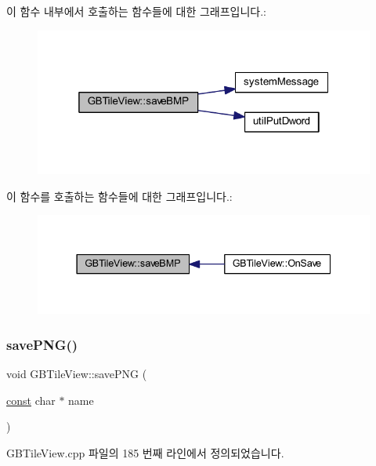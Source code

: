 이 함수 내부에서 호출하는 함수들에 대한 그래프입니다.\+:
\nopagebreak
\begin{figure}[H]
\begin{center}
\leavevmode
\includegraphics[width=319pt]{class_g_b_tile_view_ac61ccd982b57db14794e1f9febc67c16_cgraph}
\end{center}
\end{figure}
이 함수를 호출하는 함수들에 대한 그래프입니다.\+:
\nopagebreak
\begin{figure}[H]
\begin{center}
\leavevmode
\includegraphics[width=337pt]{class_g_b_tile_view_ac61ccd982b57db14794e1f9febc67c16_icgraph}
\end{center}
\end{figure}
\mbox{\label{class_g_b_tile_view_a7d48513402a49269828c3111bc153d46}} 
\subsubsection{\texorpdfstring{save\+P\+N\+G()}{savePNG()}}
{\footnotesize\ttfamily void G\+B\+Tile\+View\+::save\+P\+NG (\begin{DoxyParamCaption}\item[{\mbox{\hyperlink{getopt1_8c_a2c212835823e3c54a8ab6d95c652660e}{const}} char $\ast$}]{name }\end{DoxyParamCaption})}



G\+B\+Tile\+View.\+cpp 파일의 185 번째 라인에서 정의되었습니다.


